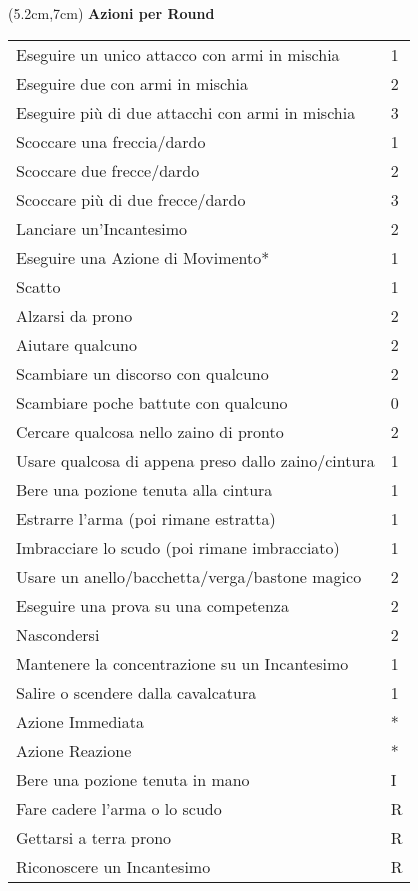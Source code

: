 \documentclass[a4paper,12 pt,openany]{book}
\begin{document}
\begin{textblock*}{10.5cm}(5.2cm,7cm) %
\textbf{Azioni per Round}

	\begin{tabular}{ll}
		Eseguire un unico attacco con armi in mischia      & 1\\
		Eseguire due con armi in mischia			       & 2\\
		Eseguire più di due attacchi con armi in mischia  & 3\\
		Scoccare una freccia/dardo                         & 1\\
		Scoccare due frecce/dardo                          & 2\\
		Scoccare più di due frecce/dardo                  & 3\\
		Lanciare un'Incantesimo                            & 2\\
		Eseguire una Azione di Movimento*                  & 1\\
		Scatto   						                   & 1\\
		Alzarsi da prono                                   & 2\\
		Aiutare qualcuno                                   & 2\\
		Scambiare un discorso con qualcuno                 & 2\\
		Scambiare poche battute con qualcuno               & 0\\
		Cercare qualcosa nello zaino di pronto             & 2\\
		Usare qualcosa di appena preso dallo zaino/cintura & 1\\
		Bere una pozione tenuta alla cintura               & 1\\
		Estrarre l'arma (poi rimane estratta)              & 1\\
		Imbracciare lo scudo (poi rimane imbracciato)      & 1\\
		Usare un anello/bacchetta/verga/bastone magico     & 2\\
		Eseguire una prova su una competenza               & 2\\
		Nascondersi										   & 2\\
		Mantenere la concentrazione su un Incantesimo      & 1\\
		Salire o scendere dalla cavalcatura				   & 1\\	
		Azione Immediata                                   & {*}\\
		Azione Reazione                                    & {*}\\
		Bere una pozione tenuta in mano     	           & I\\
		Fare cadere l'arma o lo scudo					   & R\\
		Gettarsi a terra prono							   & R\\	
		Riconoscere un Incantesimo						   & R\\
	\end{tabular}
	
	\end{textblock*}
\end{document}

